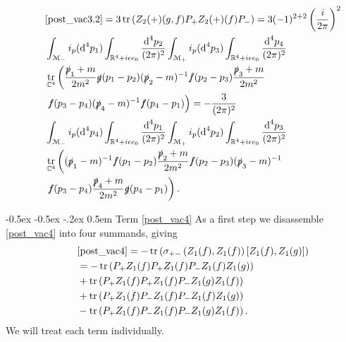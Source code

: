 \documentclass[oneside,reqno,12pt]{amsart}
\makeatletter
\DeclareMathOperator{\tr}{tr}
\renewcommand\subsection{\@startsection {subsection}{1}{\z@}%
                                   {-0.5ex \@plus -0.5ex \@minus -.2ex}%
                                   {0.5em}%
                                   {\normalfont\bfseries}}
\makeatother
\begin{document}
\begin{align*}
&\eqref{post_vac3.2}=3 \tr\left(Z_{2}(+)(g,f) P_+ Z_{2}(+)(f) P_-\right)
=3(-1)^{2+2}\left(\frac{i}{2\pi}\right)^2\\
&  \int_{\mathcal{M}_-}  i_p(\text{d}^4p_{1})
\int_{\mathbb{R}^4+i \epsilon e_0}\frac{\text{d}^4p_2}{(2\pi)^{2}} 
\int_{\mathcal{M}_+}  i_p(\text{d}^4p_{3})
\int_{\mathbb{R}^4+i\epsilon e_0}\frac{\text{d}^4p_4}{(2\pi)^{2}}\\\tag*{}
&\tr_{\mathbb{C}^4}\left(\frac{\slashed{p}_1+m}{2m^2}  \slashed{g}(p_{1}-p_2)  (\slashed{p}_2-m)^{-1}  
\slashed{f}(p_{2}-p_{3})
  \frac{\slashed{p}_{3}+m}{2m^2} \right.\\
&\left.\slashed{f}(p_{3}-p_4)  (\slashed{p}_4-m)^{-1}  
\slashed{f}(p_{4}-p_{1})\right)
=-\frac{3}{(2\pi)^2}\\
&  \int_{\mathcal{M}_-}  i_p(\text{d}^4p_{4})
\int_{\mathbb{R}^4+i \epsilon e_0}\frac{\text{d}^4p_1}{(2\pi)^{2}} 
\int_{\mathcal{M}_+}  i_p(\text{d}^4p_{2})
\int_{\mathbb{R}^4+i\epsilon e_0}\frac{\text{d}^4p_3}{(2\pi)^{2}}\\\tag*{}
&\tr_{\mathbb{C}^4}
\left( (\slashed{p}_1-m)^{-1}  \slashed{f}(p_{1}-p_{2})
  \frac{\slashed{p}_{2}+m}{2m^2} \slashed{f}(p_{2}-p_3)  (\slashed{p}_3-m)^{-1} \right.\\
&\left. \slashed{f}(p_{3}-p_{4})\frac{\slashed{p}_4+m}{2m^2}
 \slashed{g}(p_{4}-p_1)  \right)
.\end{align*}

\subsection{Term \eqref{post_vac4}}
As a first step we disassemble \eqref{post_vac4} into four summands, giving
\begin{align}\tag*{}
&\eqref{post_vac4}=- \tr\left( \sigma_{+-}\left(Z_1(f),Z_1(f)\right) \left[Z_1(f),Z_1(g)\right] \right)\\\label{post_vac4.1}
&=-\tr\left(P_+ Z_1(f) P_+Z_1(f)P_- Z_1(f) Z_1(g) \right)\\\label{post_vac4.2}
&+\tr\left(P_+ Z_1(f) P_+Z_1(f)P_- Z_1(g) Z_1(f) \right)\\\label{post_vac4.3}
&+\tr\left(P_+ Z_1(f) P_- Z_1(f)P_- Z_1(f) Z_1(g) \right)\\\label{post_vac4.4}
&-\tr\left(P_+ Z_1(f) P_- Z_1(f)P_- Z_1(g) Z_1(f) \right)
.\end{align}
We will treat each term individually.
\end{document}
